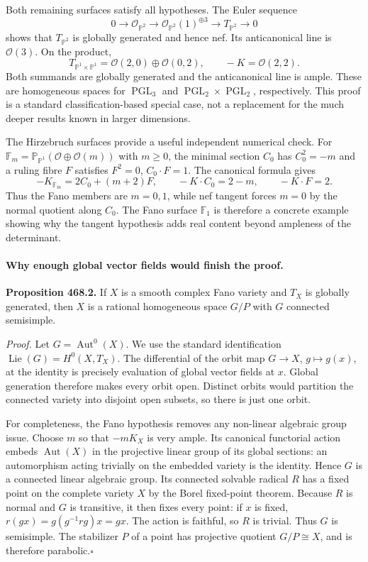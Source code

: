 \documentclass[11pt]{article}
\begin{document}
Both remaining surfaces satisfy all hypotheses. The Euler sequence
\[
 0\longrightarrow\mathcal O_{\mathbb P^2}
 \longrightarrow\mathcal O_{\mathbb P^2}(1)^{\oplus3}
 \longrightarrow T_{\mathbb P^2}\longrightarrow0
\]
shows that $T_{\mathbb P^2}$ is globally generated and hence nef.
Its anticanonical line is $\mathcal O(3)$. On the product,
\[
 T_{\mathbb P^1\times\mathbb P^1}
 =\mathcal O(2,0)\oplus\mathcal O(0,2),\qquad
 -K=\mathcal O(2,2).
\]
Both summands are globally generated and the anticanonical line is
ample. These are homogeneous spaces for $\operatorname{PGL}_3$ and
$\operatorname{PGL}_2\times\operatorname{PGL}_2$, respectively.
This proof is a standard classification-based special case, not a
replacement for the much deeper results known in larger dimensions.

The Hirzebruch surfaces provide a useful independent numerical check.
For $\mathbb F_m=\mathbb P_{\mathbb P^1}(\mathcal O\oplus\mathcal O(m))$
with $m\geq0$, the minimal section $C_0$ has $C_0^2=-m$ and a
ruling fibre $F$ satisfies $F^2=0$, $C_0\cdot F=1$.
The canonical formula gives
\[
 -K_{\mathbb F_m}=2C_0+(m+2)F,\qquad
 -K\cdot C_0=2-m,\qquad -K\cdot F=2.
\]
Thus the Fano members are $m=0,1$, while nef tangent forces $m=0$
by the normal quotient along $C_0$. The Fano surface $\mathbb F_1$
is therefore a concrete example showing why the tangent hypothesis
adds real content beyond ampleness of the determinant.

\paragraph{Why enough global vector fields would finish the proof.}
\textbf{Proposition 468.2.} If $X$ is a smooth complex Fano variety
and $T_X$ is globally generated, then $X$ is a rational homogeneous
space $G/P$ with $G$ connected semisimple.

\emph{Proof.}
Let $G=\operatorname{Aut}^0(X)$. We use the standard identification
$\operatorname{Lie}(G)=H^0(X,T_X)$. The differential of the orbit map
$G\to X$, $g\mapsto g(x)$, at the identity is precisely evaluation
of global vector fields at $x$. Global generation therefore makes
every orbit open. Distinct orbits would partition the connected variety
into disjoint open subsets, so there is just one orbit.

For completeness, the Fano hypothesis removes any non-linear algebraic
group issue. Choose $m$ so that $-mK_X$ is very ample. Its canonical
functorial action embeds $\operatorname{Aut}(X)$ in the projective
linear group of its global sections: an automorphism acting trivially
on the embedded variety is the identity. Hence $G$ is a connected
linear algebraic group. Its connected solvable radical $R$ has a fixed
point on the complete variety $X$ by the Borel fixed-point theorem.
Because $R$ is normal and $G$ is transitive, it then fixes every point:
if $x$ is fixed, $r(gx)=g(g^{-1}rg)x=gx$.
The action is faithful, so $R$ is trivial. Thus $G$ is semisimple.
The stabilizer $P$ of a point has projective quotient $G/P\cong X$,
and is therefore parabolic.\hfill$\square$
\end{document}
